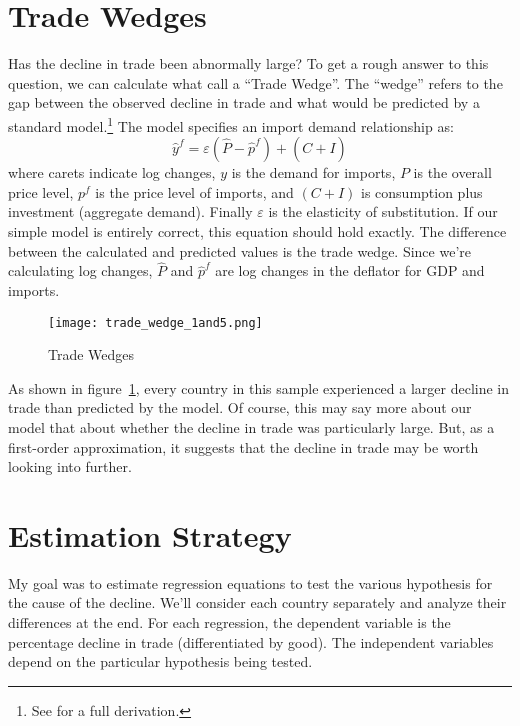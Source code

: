 \documentclass[11pt]{article}
\begin{document}
\section{Trade Wedges} %
\label{sec:trade_wedges}
  Has the decline in trade been abnormally large?  To get a rough answer to this question, we can calculate what \cite{llt:2010} call a ``Trade Wedge''.  The ``wedge'' refers to the gap between the observed decline in trade and what would be predicted by a standard model.\footnote{See \cite{llt:2010} for a full derivation.}  The model specifies an import demand relationship as:
  \begin{equation}
      \hat{y}^f = \varepsilon(\hat{P} - \hat{p}^f) + (\hat{C + I})
  \end{equation}
  where carets indicate log changes, $y$ is the demand for imports, $P$ is the overall price level, $p^f$ is the price level of imports, and $(C + I)$ is consumption plus investment (aggregate demand).  Finally $\varepsilon$ is the elasticity of substitution.  If our simple model is entirely correct, this equation should hold exactly.  The difference between the calculated and predicted values is the trade wedge.  Since we're calculating log changes, $\hat{P}$ and $\hat{p}^f$ are log changes in the deflator for GDP and imports.

  \begin{figure} \label{fig:trade_wedge}
    \centering
      \texttt{[image: trade\_wedge\_1and5.png]}
    \caption{Trade Wedges}
  \end{figure}

  As shown in figure~\ref{fig:trade_wedge}, every country in this sample experienced a larger decline in trade than predicted by the model.  Of course, this may say more about our model that about whether the decline in trade was particularly large.  But, as a first-order approximation, it suggests that the decline in trade may be worth looking into further.

\section{Estimation Strategy} %
\label{sec:estimation_strategy}
  My goal was to estimate regression equations to test the various hypothesis for the cause of the decline.  We'll consider each country separately and analyze their differences at the end.  For each regression, the dependent variable is the percentage decline in trade (differentiated by good).  The independent variables depend on the particular hypothesis being tested.
\end{document}
